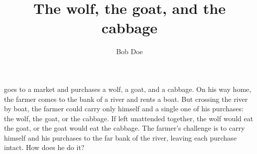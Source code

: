\documentclass[a4paper,twoside] {article}
\title{The wolf, the goat,\alice{Adding the Oxford comma here} and the cabbage}
\author{Bob Doe}
\begin{document}
\maketitle


goes to a market and
purchases a wolf, a goat, and a cabbage. On his way home, the farmer comes to
the bank of a river and rents a boat. But crossing the river by boat, the farmer
could carry only himself and a single one of his purchases: the wolf, the goat,
or the cabbage.
%
If left unattended together, the wolf would eat the goat, or the goat would eat
the cabbage.
%
The farmer's challenge is to carry himself and his purchases to the far bank of
the river, leaving each purchase intact. How does he do it?
\end{document}
